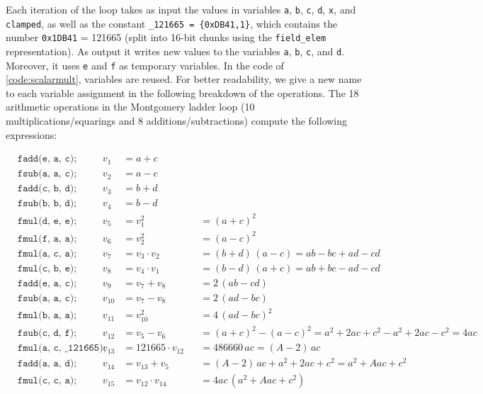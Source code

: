 \documentclass[manuscript]{acmart}
\begin{document}
Each iteration of the loop takes as input the values in variables \verb|a|, \verb|b|, \verb|c|, \verb|d|, \verb|x|, and \verb|clamped|, as well as the constant \verb|_121665 = {0xDB41,1}|, which contains the number \verb|0x1DB41| = 121665 (split into 16-bit chunks using the \verb|field_elem| representation).
As output it writes new values to the variables \verb|a|, \verb|b|, \verb|c|, and \verb|d|.
Moreover, it uses \verb|e| and \verb|f| as temporary variables.
In the code of \autoref{code:scalarmult}, variables are reused.
For better readability, we give a new name to each variable assignment in the following breakdown of the operations.
The 18 arithmetic operations in the Montgomery ladder loop (10 multiplications/squarings and 8 additions/subtractions) compute the following expressions:

\begin{align*}
    & \texttt{fadd(e, a, c);} & v_1    &= a + c \\
    & \texttt{fsub(a, a, c);} & v_2    &= a - c \\
    & \texttt{fadd(c, b, d);} & v_3    &= b + d \\
    & \texttt{fsub(b, b, d);} & v_4    &= b - d \\
    & \texttt{fmul(d, e, e);} & v_5    &= v_1^2          &&= (a + c)^2 \\
    & \texttt{fmul(f, a, a);} & v_6    &= v_2^2          &&= (a - c)^2 \\
    & \texttt{fmul(a, c, a);} & v_7    &= v_3 \cdot v_2  &&= (b + d)\,(a - c) = ab - bc + ad - cd \\
    & \texttt{fmul(c, b, e);} & v_8    &= v_4 \cdot v_1  &&= (b - d)\,(a + c) = ab + bc - ad - cd \\
    & \texttt{fadd(e, a, c);} & v_9    &= v_7 + v_8      &&= 2\,(ab - cd) \\
    & \texttt{fsub(a, a, c);} & v_{10} &= v_7 - v_8      &&= 2\,(ad - bc) \\
    & \texttt{fmul(b, a, a);} & v_{11} &= v_{10}^2       &&= 4\,(ad - bc)^2 \\
    & \texttt{fsub(c, d, f);} & v_{12} &= v_5 - v_6      &&= (a + c)^2 - (a - c)^2 = a^2 + 2ac + c^2 - a^2 + 2ac - c^2 = 4ac \\
    & \texttt{fmul(a, c, {\char`_}121665);} & v_{13} &= 121665 \cdot v_{12} &&= 486660\, ac = (A - 2)\,ac \\
    & \texttt{fadd(a, a, d);} & v_{14} &= v_{13} + v_5   &&= (A - 2)\,ac + a^2 + 2ac + c^2 = a^2 + Aac + c^2 \\
    & \texttt{fmul(c, c, a);} & v_{15} &= v_{12} \cdot v_{14} &&= 4ac\, (a^2 + Aac + c^2) \\

\end{align*}
\end{document}
